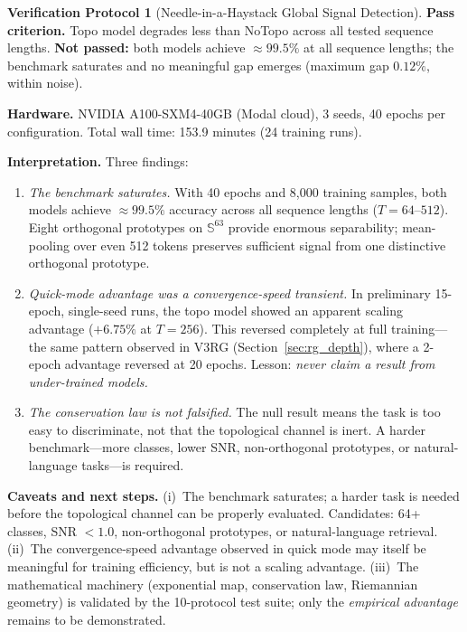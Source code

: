 \documentclass[11pt,a4paper]{article}
\theoremstyle{definition}
\newtheorem{protocol}[theorem]{Verification Protocol}
\theoremstyle{remark}
\newcommand{\Sphere}{\mathbb{S}}
\begin{document}
\begin{protocol}[Needle-in-a-Haystack Global Signal 
Detection]
\textbf{Pass criterion.} Topo model degrades less than 
NoTopo across all tested sequence lengths. \textbf{Not 
passed:} both models achieve ${\approx}99.5\%$ at all 
sequence lengths; the benchmark saturates and no meaningful 
gap emerges (maximum gap $0.12\%$, within noise).

\textbf{Hardware.} NVIDIA A100-SXM4-40GB (Modal cloud), 
3 seeds, 40 epochs per configuration. Total wall time: 
153.9 minutes (24 training runs).

\textbf{Interpretation.} Three findings:
\begin{enumerate}[nosep]
  \item \emph{The benchmark saturates.} With 40 epochs and 
  8{,}000 training samples, both models achieve 
  ${\approx}99.5\%$ accuracy across all sequence lengths 
  ($T = 64$--$512$). Eight orthogonal prototypes on 
  $\Sphere^{63}$ provide enormous separability; 
  mean-pooling over even 512 tokens preserves sufficient 
  signal from one distinctive orthogonal prototype.
  \item \emph{Quick-mode advantage was a convergence-speed 
  transient.} In preliminary 15-epoch, single-seed runs, 
  the topo model showed an apparent scaling advantage 
  ($+6.75\%$ at $T = 256$). This reversed completely at 
  full training---the same pattern observed in V3RG 
  (Section~\ref{sec:rg_depth}), where a 2-epoch advantage 
  reversed at 20 epochs. Lesson: \emph{never claim a 
  result from under-trained models.}
  \item \emph{The conservation law is not falsified.} The 
  null result means the task is too easy to discriminate, 
  not that the topological channel is inert. A harder 
  benchmark---more classes, lower SNR, non-orthogonal 
  prototypes, or natural-language tasks---is required.
\end{enumerate}

\textbf{Caveats and next steps.} (i)~The benchmark saturates; 
a harder task is needed before the topological channel can 
be properly evaluated. Candidates: 64+ classes, SNR $< 1.0$, 
non-orthogonal prototypes, or natural-language retrieval. 
(ii)~The convergence-speed advantage observed in quick mode 
may itself be meaningful for training efficiency, but is 
not a scaling advantage. (iii)~The mathematical machinery 
(exponential map, conservation law, Riemannian geometry) is 
validated by the 10-protocol test suite; only the 
\emph{empirical advantage} remains to be demonstrated.
\end{protocol}
\end{document}
